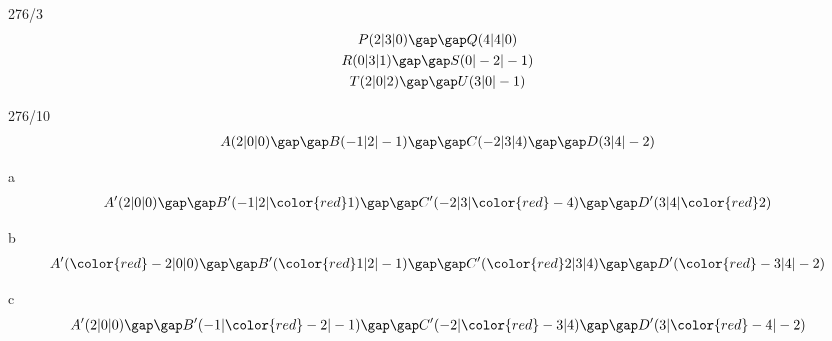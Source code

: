 \begin{exercise}{276/3}
  \begin{gather*}
    P(2|3|0) \gap\gap Q(4|4|0) \\
    R(0|3|1) \gap\gap S(0|-2|-1) \\
    T(2|0|2) \gap\gap U(3|0|-1)
  \end{gather*}
\end{exercise}
\begin{exercise}{276/10}
  \begin{gather*}
    A(2|0|0) \gap\gap B(-1|2|-1) \gap\gap C(-2|3|4) \gap\gap D(3|4|-2)
  \end{gather*}
  \item [a]
  \begin{gather*}
    A'(2|0|0) \gap\gap B'(-1|2|{\color{red}1}) \gap\gap C'(-2|3|{\color{red}-4}) \gap\gap D'(3|4|{\color{red}2})
  \end{gather*}
  \item [b]
  \begin{gather*}
    A'({\color{red}-2}|0|0) \gap\gap B'({\color{red}1}|2|-1) \gap\gap C'({\color{red}2}|3|4) \gap\gap D'({\color{red}-3}|4|-2)
  \end{gather*}
  \item [c]
  \begin{gather*}
    A'(2|0|0) \gap\gap B'(-1|{\color{red}-2}|-1) \gap\gap C'(-2|{\color{red}-3}|4) \gap\gap D'(3|{\color{red}-4}|-2)
  \end{gather*}
\end{exercise}
